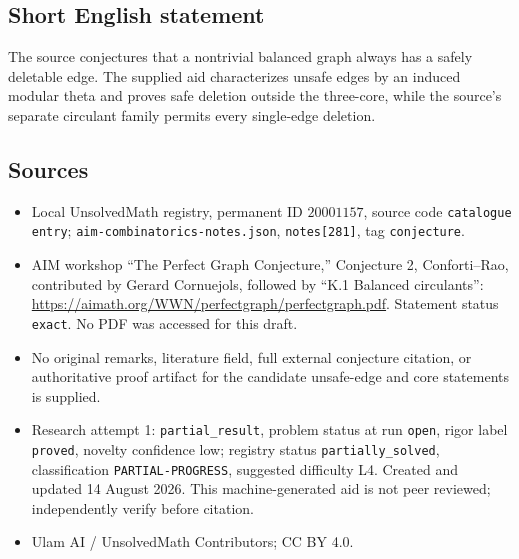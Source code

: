 \documentclass[11pt]{article}
\begin{document}
\subsection{Short English statement}
The source conjectures that a nontrivial balanced graph always has a safely deletable edge. The supplied aid characterizes unsafe edges by an induced modular theta and proves safe deletion outside the three-core, while the source's separate circulant family permits every single-edge deletion.
\subsection{Sources}
\begin{itemize}
\item Local UnsolvedMath registry, permanent ID \(20001157\), source code \texttt{catalogue entry}; \texttt{aim-combinatorics-notes.json}, \texttt{notes[281]}, tag \texttt{conjecture}.
\item AIM workshop ``The Perfect Graph Conjecture,'' Conjecture 2, Conforti--Rao, contributed by Gerard Cornuejols, followed by ``K.1 Balanced circulants'': \url{https://aimath.org/WWN/perfectgraph/perfectgraph.pdf}. Statement status \texttt{exact}. No PDF was accessed for this draft.
\item No original remarks, literature field, full external conjecture citation, or authoritative proof artifact for the candidate unsafe-edge and core statements is supplied.
\item Research attempt 1: \texttt{partial\_result}, problem status at run \texttt{open}, rigor label \texttt{proved}, novelty confidence low; registry status \texttt{partially\_solved}, classification \texttt{PARTIAL-PROGRESS}, suggested difficulty L4. Created and updated 14 August 2026. This machine-generated aid is not peer reviewed; independently verify before citation.
\item Ulam AI / UnsolvedMath Contributors; CC BY 4.0.
\end{itemize}
\end{document}
